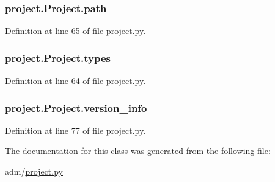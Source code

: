 \hypertarget{classproject_1_1Project_a4f614c3151a85166a2fdd2cc28f2500e}{
\subsubsection[{path}]{\setlength{\rightskip}{0pt plus 5cm}project.\-Project.\-path}}\label{classproject_1_1Project_a4f614c3151a85166a2fdd2cc28f2500e}


Definition at line 65 of file project.\-py.

\hypertarget{classproject_1_1Project_a2e8103f243f75d9fd8a1aad1e4d42438}{
\subsubsection[{types}]{\setlength{\rightskip}{0pt plus 5cm}project.\-Project.\-types}}\label{classproject_1_1Project_a2e8103f243f75d9fd8a1aad1e4d42438}


Definition at line 64 of file project.\-py.

\hypertarget{classproject_1_1Project_ad7b1bfdfc4fbbd0f18c46c27e6f3c72a}{
\subsubsection[{version\-\_\-info}]{\setlength{\rightskip}{0pt plus 5cm}project.\-Project.\-version\-\_\-info}}\label{classproject_1_1Project_ad7b1bfdfc4fbbd0f18c46c27e6f3c72a}


Definition at line 77 of file project.\-py.



The documentation for this class was generated from the following file\-:\begin{DoxyCompactItemize}
\item 
adm/\hyperlink{project_8py}{project.\-py}\end{DoxyCompactItemize}
